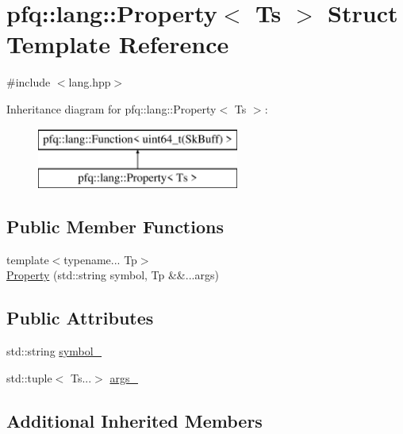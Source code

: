 \hypertarget{structpfq_1_1lang_1_1Property}{\section{pfq\+:\+:lang\+:\+:Property$<$ Ts $>$ Struct Template Reference}
\label{structpfq_1_1lang_1_1Property}
}


{\ttfamily \#include $<$lang.\+hpp$>$}

Inheritance diagram for pfq\+:\+:lang\+:\+:Property$<$ Ts $>$\+:\begin{figure}[H]
\begin{center}
\leavevmode
\includegraphics[height=2.000000cm]{structpfq_1_1lang_1_1Property}
\end{center}
\end{figure}
\subsection*{Public Member Functions}
\begin{DoxyCompactItemize}
\item 
{\footnotesize template$<$typename... Tp$>$ }\\\hyperlink{structpfq_1_1lang_1_1Property_a65d215ea79feeaf43feaa02f3c8a31a4}{Property} (std\+::string symbol, Tp \&\&...args)
\end{DoxyCompactItemize}
\subsection*{Public Attributes}
\begin{DoxyCompactItemize}
\item 
std\+::string \hyperlink{structpfq_1_1lang_1_1Property_a27cdbc97fd6ffc8b92ff75599c7dce72}{symbol\+\_\+}
\item 
std\+::tuple$<$ Ts...$>$ \hyperlink{structpfq_1_1lang_1_1Property_a01e0bf793226860cbafe4bea5075d507}{args\+\_\+}
\end{DoxyCompactItemize}
\subsection*{Additional Inherited Members}



